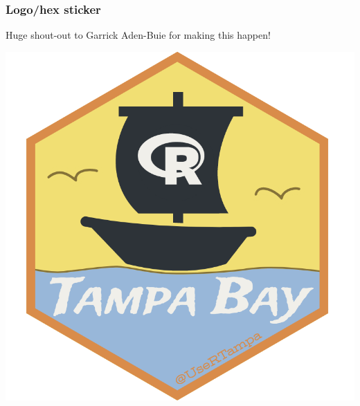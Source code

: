 \documentclass{beamer}
\begin{document}
\small{

\begin{frame}[t]
\frametitle{Logo/hex sticker}
Huge shout-out to Garrick Aden-Buie for making this happen!\\
\begin{center}
\includegraphics[scale=.25, trim=0 0 0 0]{figures/trug-hex-800.png}
\end{center}
\end{frame}

}
\end{document}
